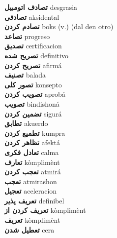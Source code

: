 \textbf{ تصادف اتومبیل  } desgrasia \\
\textbf{ تصادفی  } aksidental \\
\textbf{ تصادم کردن  } boks (v.) (dal den otro) \\
\textbf{ تصاعد  } progreso \\
\textbf{ تصدیق  } certificacion \\
\textbf{ تصریح شده  } definitivo \\
\textbf{ تصریح کردن  } afirmá \\
\textbf{ تصنیف  } balada \\
\textbf{ تصور کلی  } konsepto \\
\textbf{ تصویب کردن  } aprobá \\
\textbf{ تصویب  } bindishoná \\
\textbf{ تضمین کردن  } sigurá \\
\textbf{ تطابق  } akuerdo \\
\textbf{ تطمیع کردن  } kumpra \\
\textbf{ تظاهر کردن  } afektá \\
\textbf{ تعادل فکری  } calma \\
\textbf{ تعارف  } kòmplimènt \\
\textbf{ تعجب کردن  } atmirá \\
\textbf{ تعجب  } atmirashon \\
\textbf{ تعجیل  } aceleracion \\
\textbf{ تعریف پذیر  } definibel \\
\textbf{ تعریف کردن از  } kòmplimènt \\
\textbf{ تعریف  } kòmplimènt \\
\textbf{ تعطیل شدن  } cera \\
